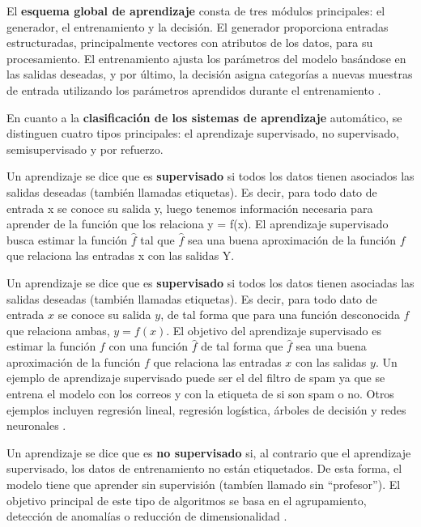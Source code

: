 \bigskip

El \textbf{esquema global de aprendizaje} consta de tres módulos principales: el generador, el entrenamiento y la decisión. El generador proporciona entradas estructuradas, principalmente vectores con atributos de los datos, para su procesamiento. El entrenamiento ajusta los parámetros del modelo basándose en las salidas deseadas, y por último, la decisión asigna categorías a nuevas muestras de entrada utilizando los parámetros aprendidos durante el entrenamiento \citep{pajares2021aprendizaje}.

\bigskip

En cuanto a la \textbf{clasificación de los sistemas de aprendizaje} automático, se distinguen cuatro tipos principales: el aprendizaje supervisado, no supervisado, semisupervisado y por refuerzo.

Un aprendizaje se dice que es \textbf{supervisado} si todos los datos tienen asociados las salidas deseadas (también llamadas etiquetas). Es decir, para todo dato de entrada x se conoce su salida y, luego tenemos información necesaria para aprender de la función que los relaciona y = f(x). El aprendizaje supervisado busca estimar la función $\hat{f}$ tal que $\hat{f}$ sea una buena aproximación de la función $f$ que relaciona las entradas x con las salidas Y.

Un aprendizaje se dice que es \textbf{supervisado} si todos los datos tienen asociadas las salidas deseadas (también llamadas etiquetas). Es decir, para todo dato de entrada \( x \) se conoce su salida \( y \), de tal forma que para una función desconocida $f$ que relaciona ambas, $y=f(x)$. El objetivo del aprendizaje supervisado es estimar la función \( f \) con una función \( \hat{f} \) de tal forma que \( \hat{f} \) sea una buena aproximación de la función \( f \) que relaciona las entradas \( x \) con las salidas \( y \). Un ejemplo de aprendizaje supervisado puede ser el del filtro de spam ya que se entrena el modelo con los correos y con la etiqueta de si son spam o no. Otros ejemplos incluyen regresión lineal, regresión logística, árboles de decisión y redes neuronales \citep{geron2022hands}.


Un aprendizaje se dice que es \textbf{no supervisado} si, al contrario que el aprendizaje supervisado, los datos de entrenamiento no están etiquetados. De esta forma, el modelo tiene que aprender sin supervisión (tambíen llamado sin ``profesor''). El objetivo principal de este tipo de algoritmos se basa en el agrupamiento, detección de anomalías o reducción de dimensionalidad \citep{geron2022hands}. 


